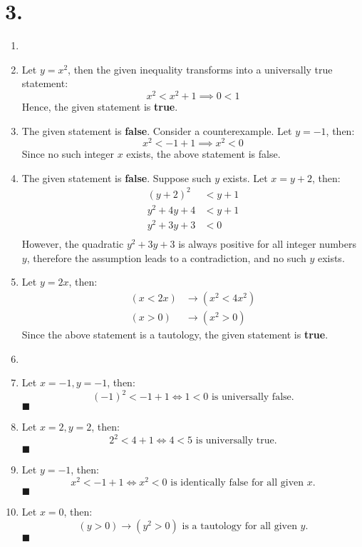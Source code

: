\documentclass[12pt]{article}
\newcommand{\p}[1]{\item[\textnormal{(#1)}]}
\newcommand{\q}{\hfill $\blacksquare$}
\newenvironment{ps}
{\begin{enumerate}[leftmargin=0em, itemindent=1.5em]}
{\end{enumerate}}
\begin{document}
\section*{3.}
\begin{ps}

    \p{a}
    \p{i} Let \( y = x^2 \), then the given inequality transforms into a universally true statement:
        \[ 
            x^2 < x^2 + 1 \implies 0< 1 
        \]
        Hence, the given statement is \textbf{true}.

    \p{ii} The given statement is \textbf{false}. Consider a counterexample. Let \( y = -1 \), then: 
    \[
        x^2 < -1 + 1 \implies x^2 < 0
    \]   
    Since no such integer \( x \) exists, the above statement is false.
    
    \p{iii} The given statement is \textbf{false}. Suppose such \( y \) exists. Let \( x = y + 2 \),
    then: 
    \begin{align*}
        (y + 2)^2 &< y + 1 \\
        y^2 + 4y + 4 &< y + 1 \\
        y^2 + 3y + 3 &< 0 \\
    \end{align*}
    However, the quadratic \( y^2 + 3y + 3 \) is always positive for all integer numbers \( y \),
    therefore the assumption leads to a contradiction, and no such \( y \) exists.

    \p{iv} Let \( y = 2x \), then:
    \begin{align*}
        (x < 2x) &\rightarrow (x^2 < 4x^2) \\
        (x > 0) &\rightarrow (x^2 > 0)
    \end{align*}
    Since the above statement is a tautology, the given statement is \textbf{true}.

    \p{b}
    \p{i} Let \( x = -1, y = -1 \), then: 
    \[ 
        (-1)^2 < -1 + 1 \Leftrightarrow 1 < 0 \text{ is universally false.}
    \]\q

    \p{ii} Let \( x = 2, y = 2 \), then:
    \[
        2^2 < 4 + 1 \Leftrightarrow 4 < 5 \text{ is universally true.} 
    \]\q

    \p{iii} Let \( y = -1 \), then:
    \[
        x^2 < -1 + 1 \Leftrightarrow x^2 < 0 \text{ is identically false for all given } x.
    \]\q

    \p{iv} Let \( x = 0 \), then:
    \[
        (y > 0) \rightarrow (y^2 > 0) \text{ is a tautology for all given } y.
    \]\q

\end{ps}
\end{document}
